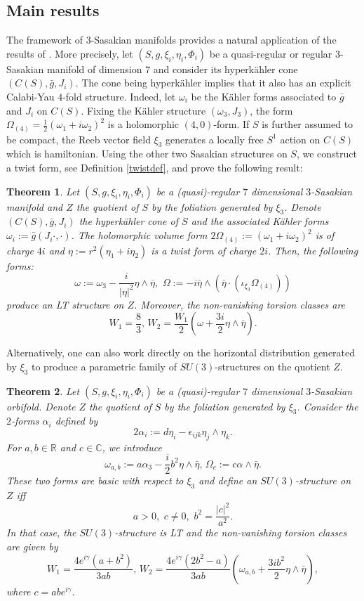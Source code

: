 \documentclass[12pt, reqno]{amsart}
\newtheorem{introthm}{Theorem}
\theoremstyle{definition}
\newcommand{\R}{\mathbb{R}}
\newcommand{\C}{\mathbb{C}}
\begin{document}
\subsection{Main results} The framework of $3$-Sasakian manifolds provides a natural application of the results of \cite{peres2026sunstructuresquotienttorusactions}. More precisely, let $(S,g,\xi_i,\eta_i,\Phi_i)$ be a quasi-regular or regular $3$-Sasakian manifold of dimension $7$ and consider its hyperkähler cone $(C(S),\bar g, J_i)$. The cone being hyperkähler implies that it also has an explicit Calabi-Yau $4$-fold structure. Indeed, let $\omega_i$ be the Kähler forms associated to $\bar g$ and $J_i$ on $C(S)$. Fixing the Kähler structure $(\omega_3,J_3)$, the form $\Omega_{(4)}=\frac{1}{2}(\omega_1+i\omega_2)^2$ is a holomorphic $(4,0)$-form. If $S$ is further assumed to be compact, the Reeb vector field $\xi_3$ generates a locally free $S^1$ action on $C(S)$ which is hamiltonian. Using the other two Sasakian structures on $S$, we construct a twist form, see Definition \ref{twistdef}, and prove the following result:
\begin{introthm}\label{theo1}
    Let $(S,g,\xi_i,\eta_i,\Phi_i)$ be a (quasi)-regular $7$ dimensional $3$-Sasakian manifold and $Z$ the quotient of $S$ by the foliation generated by $\xi_3$. Denote $(C(S),\bar g,J_i)$ the hyperkähler cone of $S$ and the associated Kähler forms $\omega_i:=\bar g(J_i\cdot,\cdot)$. The holomorphic volume form $2\Omega_{(4)}:=(\omega_1+i\omega_2)^2$ is of charge $4i$ and $\eta:=r^2(\eta_1+i\eta_2)$ is a twist form of charge $2i$. Then, the following forms: $$\omega:=\omega_3-\frac{i}{|\eta|^2}\eta\wedge\bar\eta,\,\, \Omega:=-i\bar\eta\wedge(\bar\eta\cdot(\iota_{\xi_3}\Omega_{(4)}))$$ produce an LT structure on $Z$. Moreover, the non-vanishing torsion classes are
    $$W_1=\frac{8}{3},\, W_2=\frac{W_1}{2}(\omega+\frac{3i}{2}\eta\wedge\bar\eta).$$
\end{introthm}
Alternatively, one can also work directly on the horizontal distribution generated by $\xi_3$ to produce a parametric family of $SU(3)$-structures on the quotient $Z$.
\begin{introthm}\label{theo2}
    Let $(S,g,\xi_i,\eta_i,\Phi_i)$ be a (quasi)-regular $7$ dimensional $3$-Sasakian orbifold. Denote $Z$ the quotient of $S$ by the foliation generated by $\xi_3$. Consider the $2$-forms $\alpha_i$ defined by $$2\alpha_i:=d\eta_i-\epsilon_{ijk}\eta_j\wedge\eta_k.$$ For $a,b\in\R$ and $c\in\C$, we introduce $$\omega_{a,b}:=a\alpha_3-\frac{i}{2}b^2\eta\wedge\bar\eta,\, \Omega_c:=c\alpha\wedge\bar\eta.$$ These two forms are basic with respect to $\xi_3$ and define an $SU(3)$-structure on $Z$ iff $$a>0,\,\, c\neq 0,\,\, b^2= \frac{|c|^2}{a^2}.$$ In that case, the $SU(3)$-structure is LT and the non-vanishing torsion classes are given by $$W_1=\frac{4e^{i\gamma}(a+b^2)}{3ab},\, W_2=\frac{4e^{i\gamma}(2b^2-a)}{3ab}(\omega_{a,b}+\frac{3ib^2}{2}\eta\wedge\bar\eta),$$ where $c=abe^{i\gamma}.$
\end{introthm}
\end{document}
